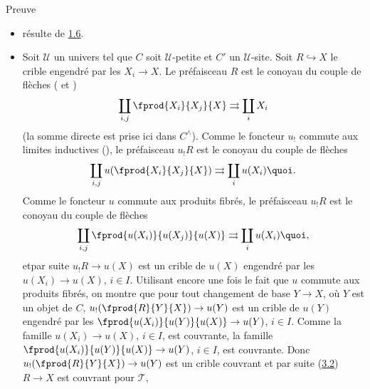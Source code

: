 \begin{enonce*}[remark]{Preuve}
\begin{itemize}
\item[i) $\Rightarrow$ ii):] résulte de \hyperref[III.prop1.6]{1.6}.

\item[ii) $\Rightarrow$ i):] Soit $𝒰$ un univers tel que $C$
  soit $𝒰$-petite et $C'$ un $𝒰$-site. Soit
  $R\hookrightarrow X$ le crible engendré par les $X_i\rightarrow
  X$. Le préfaisceau $R$ est le conoyau du couple de flèches
( et )
$$
\coprod_{i,j} \fprod{X_i}{X_j}{X}\rightrightarrows \coprod_i X_i
$$
(la somme directe est prise ici dans $C^{\wedge}$).
Comme le foncteur $u_{!}$ commute aux limites inductives
(), le préfaisceau $u_{!}R$ est le conoyau du couple
de flèches
$$
\coprod_{i,j}u(\fprod{X_i}{X_j}{X})\rightrightarrows \coprod_i
u(X_i){\quoi}.
$$
Comme le foncteur $u$ commute aux produits fibrés, le
préfaisceau $u_{!}R$ est le conoyau du couple de flèches
$$
\coprod_{i,j}\fprod{u(X_i)}{u(X_j)}{u(X)}\rightrightarrows \coprod_i
u(X_i){\quoi},
$$
et\pageoriginale par suite $u_{!}R\rightarrow u(X)$ est un crible de
$u(X)$ engendré par les $u(X_i)\rightarrow u(X)$, $i\in I$.
Utilisant encore une fois le fait que $u$ commute aux produits
fibrés, on montre que pour tout changement de base $Y\rightarrow
X$, où $Y$ est un objet de $C$, $u_{!}(\fprod{R}{Y}{X})\rightarrow
u(Y)$ est un crible de $u(Y)$ engendré par les
$\fprod{u(X_i)}{u(Y)}{u(X)}\rightarrow u(Y)$, $i\in I$. Comme la
famille $u(X_i)\rightarrow u(X)$, $i\in I$, est couvrante, la
famille $\fprod{u(X_i)}{u(Y)}{u(X)}\rightarrow u(Y)$, $i\in I$, est
couvrante. Donc $u_{!}(\fprod{R}{Y}{X})\rightarrow u(Y)$ est un
crible couvrant et par suite (\hyperref[III.prop3.2]{3.2}) $R\rightarrow X$
est couvrant pour $𝒯$, \cqfd
\end{itemize}
\end{enonce*}

